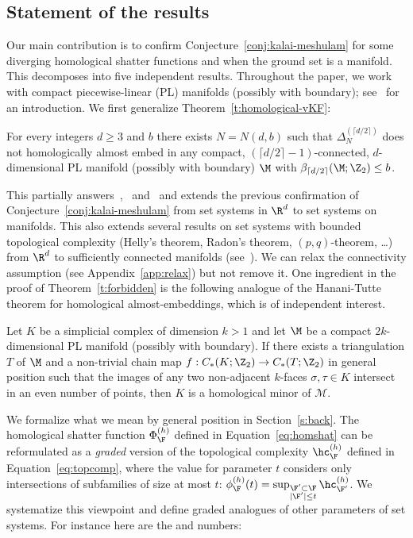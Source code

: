 \subsection{Statement of the results}\label{s:results}
%
Our main contribution is to confirm Conjecture~\ref{conj:kalai-meshulam} for some diverging homological shatter functions and when the ground set is a manifold. This decomposes into five independent results.
%
\medskip
%
Throughout the paper, we work with compact piecewise-linear (PL) manifolds (possibly with  boundary); see~\cite[$\mathsection 1$]{Rourke1972IntroductionTP} for an introduction. We first generalize Theorem~\ref{t:homological-vKF}:
%
\begin{theorem}\label{t:forbidden}
For every integers $d \ge 3$ and $b$ there exists $N=N(d,b)$ such that $\Delta_{N}^{(\lceil d/2 \rceil)}$ does not homologically almost embed in any compact, $(\lceil d/2 \rceil-1)$-connected, $d$-dimensional PL manifold (possibly with boundary) $\M$ with $\beta_{\lceil d/2 \rceil}(\M;\Z_2) \le b$.
\end{theorem}
%
\noindent
This partially answers~\cite[Problem~3]{patakova2022bounding},~\cite[Conjecture~1.7]{steppingUp} and~\cite[Conjecture~2]{patak2025sharper} and extends the previous confirmation of Conjecture~\ref{conj:kalai-meshulam} from set systems in $\R^d$ to set systems on manifolds. This also extends several results on set systems with bounded topological complexity (Helly's theorem, Radon's theorem, $(p,q)$-theorem, \ldots) from $\R^d$ to sufficiently connected manifolds (see~\cite{patakova2022bounding,steppingUp}). We can relax the connectivity assumption (see Appendix~\ref{app:relax}) but not remove it.
%
\medskip
%
 One ingredient in the proof of Theorem~\ref{t:forbidden} is the following analogue of the Hanani-Tutte theorem for homological almost-embeddings, which is of independent interest.
%
\begin{theorem}\label{t:HT}
  Let $K$ be a simplicial complex of dimension $k>1$ and let $\M$ be a compact
  $2k$-dimensional PL manifold (possibly with boundary). If there exists a triangulation $T$ of $\M$ and a non-trivial chain map $f:C_*(K; \Z_2)\to C_*(T; \Z_2)$ in
  general position such that the images of any two non-adjacent
  $k$-faces $\sigma,\tau\in K$ intersect in an even number of points,
  then $K$ is a homological minor of $\mathcal{M}$.
\end{theorem}
%
\noindent
We formalize what we mean by general position in Section~\ref{s:back}.
%
\medskip
%
The homological shatter function $\Phi_\F^{(h)}$ defined in Equation~\eqref{eq:homshat} can be reformulated as a \emph{graded} version of the topological complexity $\hc^{(h)}_\F$ defined in Equation~\eqref{eq:topcomp}, where the value for parameter $t$ considers only intersections of subfamilies of size at most $t$: $\phi_\F^{(h)}(t)= \sup_{\substack{\F'\subset\F\\ |\F'| \le t} }\hc^{(h)}_{\F'}$. We systematize this viewpoint and define graded analogues of other parameters of set systems. For instance here are the  and  numbers:
